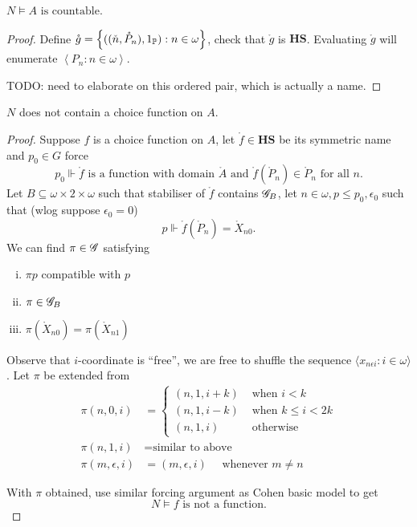 \begin{lemma}
    \(N\models A\text{ is countable}\).
\end{lemma}
\begin{proof}
  Define \(\mathring{g} = {\left\{ ((\check{n}, \mathring{P}_n), 1_{\mathbb{P}}): n\in\omega \right\}}\), check that \(\mathring{g}\) is \(\mathbf{HS}\).
  Evaluating \(\mathring{g}\) will enumerate \(\left\langle P_n: n\in\omega\right\rangle\).

  TODO: need to elaborate on this ordered pair, which is actually a name.
\end{proof}

\begin{theorem}
    \(N\) does not contain a choice function on \(A\).
\end{theorem}
\begin{proof}
Suppose \(f\) is a choice function on \(A\), let \(\mathring{f}\in\mathbf{HS}\) be its symmetric name and \(p_0\in G\) force
\[p_0\Vdash \mathring{f}\text{ is a function with domain } \mathring{A} \text{ and } \mathring{f}(\mathring{P}_n) \in \mathring{P}_n\text{ for all }n .\]
Let \(B\subseteq \omega\times2\times\omega\) such that stabiliser of \(\mathring{f}\) contains \(\mathscr{G}_B\),
let \(n\in\omega, p\leq p_0, \epsilon_0\) such that (wlog suppose \(\epsilon_0 = 0\))
\[ p\Vdash \mathring{f}(\mathring{P}_n) = \mathring{X}_{n0}. \]
We can find \(\pi\in\mathscr{G}\) satisfying
\begin{enumerate}[i.]
    \item \(\pi p\) compatible with \(p\)
    \item \(\pi \in \mathscr{G}_B\)
    \item \(\pi(\mathring{X}_{n0}) = \pi(\mathring{X}_{n1})\)
\end{enumerate}
Observe that \(i\)-coordinate is ``free'',
we are free to shuffle the sequence \(\langle x_{n\epsilon i}:i\in\omega\rangle\).
Let \(\pi\) be extended from
\begin{align*}
    \pi(n,0,i) &=
    \begin{cases}
        (n,1,i+k) &\text{ when } i < k \\
        (n,1,i-k) &\text{ when } k \leq i < 2k \\
        (n,1,i) &\text{ otherwise}
    \end{cases} \\
    \pi(n,1,i) &= \text{similar to above} \\
    \pi(m,\epsilon,i) &= (m,\epsilon,i) \quad\text{ whenever }m \ne n
\end{align*}

With \(\pi\) obtained, use similar forcing argument as Cohen basic model to get
\[ N\models f\text{ is not a function}. \tag*{\qedhere} \]
\end{proof}
